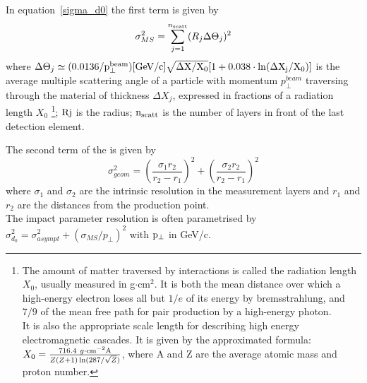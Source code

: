 In equation~\ref{sigma_d0} the first term is given by
\begin{equation}
  \sigma_{MS}^2 = \sum_{j=1}^{n_{\rm scatt}}(R_{j}\Delta\Theta_{j})^2
\end{equation}
where
$\Delta\Theta_{j}\simeq{\rm (0.0136/p_{\perp}^{\rm beam})[GeV/c]\sqrt{{\Delta
      X}/{X_{0}}}[1+0.038 \cdot \ln({\Delta X_{j}}/{X_{0}})]}$
is the average multiple scattering angle of a particle with momentum
$p_{\perp}^{beam}$ traversing through the material of thickness $\Delta X_{j}$,
expressed in fractions of a radiation length $X_{0}$ \footnote{The amount of
  matter traversed by interactions is called the radiation length $X_0$, usually
  measured in g$\cdot$cm$^2$. It is both the mean distance over which a
  high-energy electron loses all but $1/e$ of its energy by bremsstrahlung, and
  $7/9$ of the mean
  free path for pair production by a high-energy photon.\\
  It is also the appropriate scale length for describing high energy
  electromagnetic cascades. It is given by the approximated formula:
  $X_{0}=\frac{716.4~g\cdot \rm{cm}^{-2} A}{Z(Z+1)\ln (287/\sqrt{Z})}$, where A
  and Z are the average atomic mass and proton number.}; ${\rm Rj}$ is the
radius; ${\rm n_{scatt}}$ is the number of layers in front of the last detection
element.

The second term of the  is given by
\begin{equation}
  \sigma_{geom}^2 = (\frac{\sigma_{1}r_{2}}{r_{2}-r_{1}})^2 + (\frac{\sigma_{2}r_{2}}{r_{2}-r_{1}})^2 
\end{equation}
where $\sigma_{1}$ and $\sigma_{2}$ are the intrinsic resolution in the
measurement layers and $r_{1}$ and $r_{2}$ are the distances from
the production point.\\
The impact parameter resolution is often parametrised by
$\sigma_{d_0}^2 =\sigma_{asympt}^2 + (\sigma_{MS}/p_{\perp})^2$ with
$\rm p_{\perp}$ in GeV/c.

